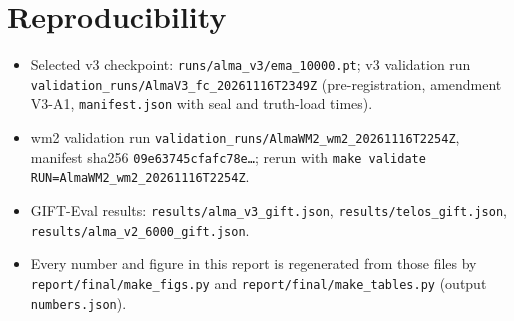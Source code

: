 \documentclass[10pt,a4paper]{extarticle}
\newcommand{\code}[1]{\texttt{\small #1}}
\begin{document}
\section{Reproducibility}
\begin{itemize}
\item Selected v3 checkpoint: \code{runs/alma\_v3/ema\_10000.pt}; v3 validation run \code{validation\_runs/AlmaV3\_fc\_20261116T2349Z}
(pre-registration, amendment V3-A1, \code{manifest.json} with seal and truth-load times).
\item wm2 validation run \code{validation\_runs/AlmaWM2\_wm2\_20261116T2254Z}, manifest sha256 \code{09e63745cfafc78e\ldots};
rerun with \code{make validate RUN=AlmaWM2\_wm2\_20261116T2254Z}.
\item GIFT-Eval results: \code{results/alma\_v3\_gift.json}, \code{results/telos\_gift.json}, \code{results/alma\_v2\_6000\_gift.json}.
\item Every number and figure in this report is regenerated from those files by \code{report/final/make\_figs.py} and
\code{report/final/make\_tables.py} (output \code{numbers.json}).
\end{itemize}
\end{document}
